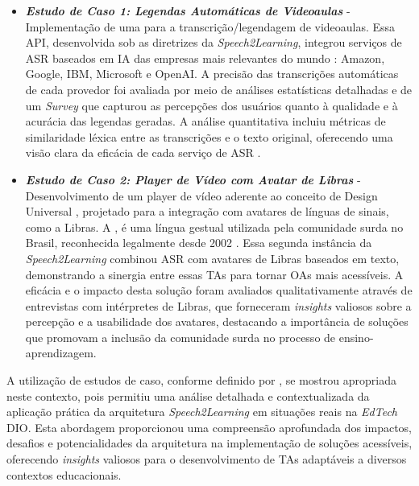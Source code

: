 \begin{itemize}
\item \textbf{\textit{Estudo de Caso 1: Legendas Automáticas de Videoaulas}} - Implementação de uma  para a transcrição/legendagem de videoaulas. Essa API, desenvolvida sob as diretrizes da \textit{Speech2Learning}, integrou serviços de ASR baseados em IA das empresas mais relevantes do mundo \cite{Gartner2023}: Amazon, Google, IBM, Microsoft e OpenAI. A precisão das transcrições automáticas de cada provedor foi avaliada por meio de análises estatísticas detalhadas e de um \textit{Survey} que capturou as percepções dos usuários quanto à qualidade e à acurácia das legendas geradas. A análise quantitativa incluiu métricas de similaridade léxica entre as transcrições e o texto original, oferecendo uma visão clara da eficácia de cada serviço de ASR \cite{FalvoJr2023_HICSS}.

\item \textbf{\textit{Estudo de Caso 2: Player de Vídeo com Avatar de Libras}} - Desenvolvimento de um player de vídeo aderente ao conceito de Design Universal \cite{GovBr2023}, projetado para a integração com avatares de línguas de sinais, como a Libras. A , é uma língua gestual utilizada pela comunidade surda no Brasil, reconhecida legalmente desde 2002 \cite{Quadros2017, Quadros2019, Honora2021}. Essa segunda instância da \textit{Speech2Learning} combinou ASR com avatares de Libras baseados em texto, demonstrando a sinergia entre essas TAs para tornar OAs mais acessíveis. A eficácia e o impacto desta solução foram avaliados qualitativamente através de entrevistas com intérpretes de Libras, que forneceram \textit{insights} valiosos sobre a percepção e a usabilidade dos avatares, destacando a importância de soluções que promovam a inclusão da comunidade surda no processo de ensino-aprendizagem.
\end{itemize}

A utilização de estudos de caso, conforme definido por , se mostrou apropriada neste contexto, pois permitiu uma análise detalhada e contextualizada da aplicação prática da arquitetura \textit{Speech2Learning} em situações reais na \textit{EdTech} DIO. Esta abordagem proporcionou uma compreensão aprofundada dos impactos, desafios e potencialidades da arquitetura na implementação de soluções acessíveis, oferecendo \textit{insights} valiosos para o desenvolvimento de TAs adaptáveis a diversos contextos educacionais.

